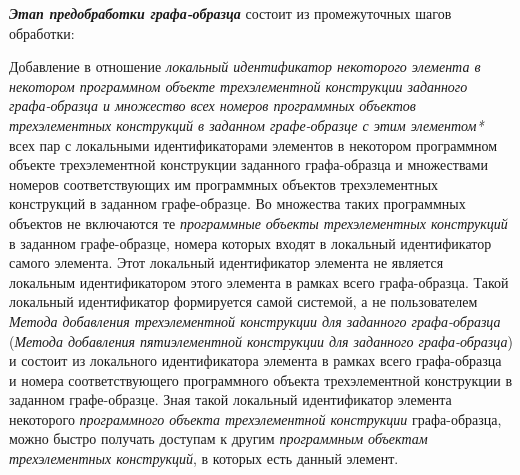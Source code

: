 \textbf{\textit{Этап предобработки графа-образца}} состоит из  промежуточных шагов обработки:
\begin{textitemize}
	\item Добавление в отношение \textit{локальный идентификатор некоторого элемента в некотором программном объекте трехэлементной конструкции заданного графа-образца и множество всех номеров программных объектов трехэлементных конструкций в заданном графе-образце с этим элементом*} всех пар с локальными идентификаторами элементов в некотором программном объекте трехэлементной конструкции заданного графа-образца и множествами номеров соответствующих им программных объектов трехэлементных конструкций в заданном графе-образце. Во множества таких программных объектов не включаются те \textit{программные объекты трехэлементных конструкций} в заданном графе-образце, номера которых входят в локальный идентификатор самого элемента. Этот локальный идентификатор элемента не является локальным идентификатором этого элемента в рамках всего графа-образца. Такой локальный идентификатор формируется самой системой, а не пользователем \textit{Метода добавления трехэлементной конструкции для заданного графа-образца} (\textit{Метода добавления пятиэлементной конструкции для заданного графа-образца}) и состоит из локального идентификатора элемента в рамках всего графа-образца и номера соответствующего программного объекта трехэлементной конструкции в заданном графе-образце. Зная такой локальный идентификатор элемента некоторого \textit{программного объекта трехэлементной конструкции} графа-образца, можно быстро получать доступам к другим \textit{программным объектам трехэлементных конструкций}, в которых есть данный элемент.

\end{textitemize}
